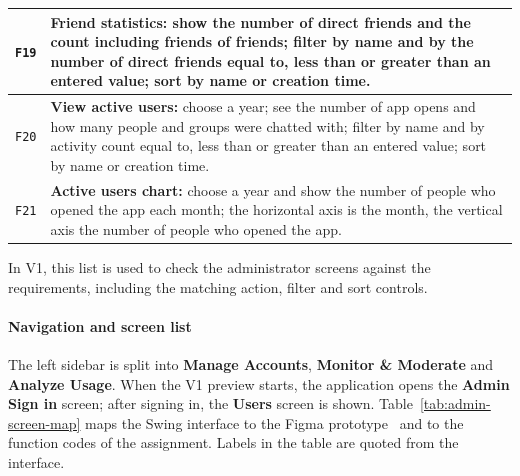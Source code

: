 \begin{longtable}{|C{1.2cm}|L{\dimexpr\textwidth-1.2cm-4\arrayrulewidth\relax}|}
  \hline
  \hypertarget{F19}{\texttt{F19}} &
  \textbf{Friend statistics:} show the number of direct friends and the count
  including friends of friends; filter by name and by the number of direct friends
  equal to, less than or greater than an entered value; sort by name or creation time.\\
  \hline
  \hypertarget{F20}{\texttt{F20}} &
  \textbf{View active users:} choose a year; see the number of app opens and how
  many people and groups were chatted with; filter by name and by activity count
  equal to, less than or greater than an entered value;
  sort by name or creation time.\\
  \hline
  \hypertarget{F21}{\texttt{F21}} &
  \textbf{Active users chart:} choose a year and show the number of people who
  opened the app each month; the horizontal axis is the month, the vertical axis
  the number of people who opened the app.\\
  \hline
\end{longtable}
\endgroup

In V1, this list is used to check the administrator screens against the
requirements, including the matching action, filter and sort controls.

\paragraph{Navigation and screen list}
\label{par:admin-navigation}
\mbox{}\par
The left sidebar is split into \textbf{Manage Accounts},
\textbf{Monitor \& Moderate} and \textbf{Analyze Usage}. When the V1 preview starts,
the application opens the \textbf{Admin Sign in} screen; after signing in, the
\textbf{Users} screen is shown. Table~\ref{tab:admin-screen-map}
maps the Swing interface to the Figma prototype~\cite{ref:figma} and to the
function codes of the assignment. Labels in the table are quoted from the interface.

